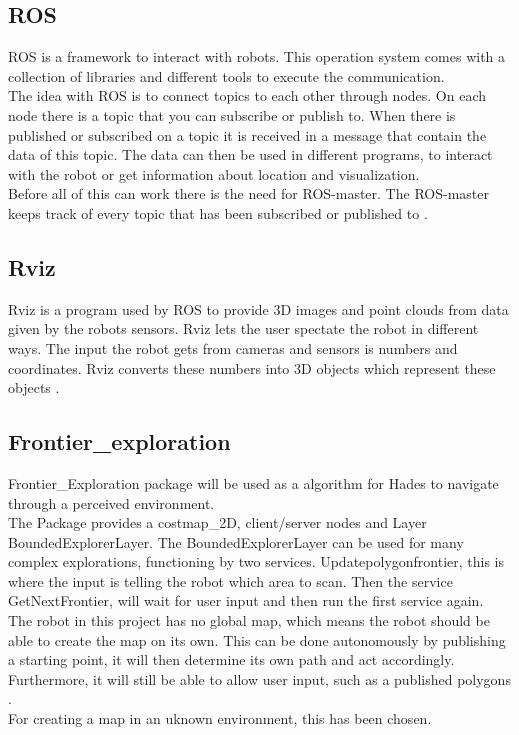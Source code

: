 \subsection{ROS}
ROS is a framework to interact with robots. This operation system comes with a collection of libraries and different tools to execute the communication.\\
The idea with ROS is to connect topics to each other through nodes. On each node there is a topic that you can subscribe or publish to. When there is published or subscribed on a topic it is received in a message that contain the data of this topic. The data can then be used in different programs, to interact with the robot or get information about location and visualization. \\
Before all of this can work there is the need for ROS-master. The ROS-master keeps track of every topic that has been subscribed or published to \cite{ROSwiki}.

\subsection{Rviz}
Rviz is a program used by ROS to provide 3D images and point clouds from data given by the robots sensors. Rviz lets the user spectate the robot in different ways. The input the robot gets from cameras and sensors is numbers and coordinates. Rviz converts these numbers into 3D objects which represent these objects \cite{interactiveMarkers}.

\subsection{Frontier\_exploration}
Frontier\_Exploration package will be used as a algorithm for Hades to navigate through a perceived environment.\\
The Package provides a costmap\_2D, client/server nodes and Layer BoundedExplorerLayer. The BoundedExplorerLayer can be used for many complex explorations, functioning by two services. Updatepolygonfrontier, this is where the input is telling the robot which area to scan. Then the service GetNextFrontier, will wait for user input and then run the first service again.\\
The robot in this project has no global map, which means the robot should be able to create the map on its own. This can be done autonomously by publishing a starting point, it will then determine its own path and act accordingly. Furthermore, it will still be able to allow user input, such as a published polygons \cite{ROSexploration}.\\
For creating a map in an uknown environment, this has been chosen.


